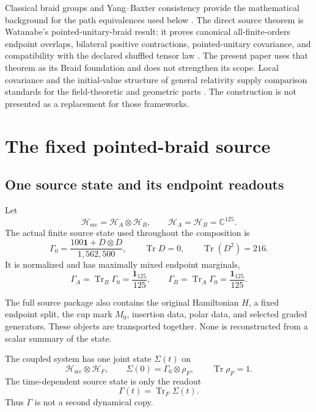 \documentclass[11pt]{article}
\theoremstyle{definition}
\theoremstyle{remark}
\newcommand{\cH}{\mathcal{H}}
\newcommand{\Tr}{\operatorname{Tr}}
\newcommand{\id}{\mathbf{1}}
\begin{document}
Classical braid groups and Yang--Baxter consistency provide the mathematical background for the path equivalences used below \cite{artin1947,yang1967,lamberadford1997}. The direct source theorem is Watanabe's pointed-unitary-braid result: it proves canonical all-finite-orders endpoint overlaps, bilateral positive contractions, pointed-unitary covariance, and compatibility with the declared shuffled tensor law \cite{watanabe2026braid}. The present paper uses that theorem as its Braid foundation and does not strengthen its scope. Local covariance and the initial-value structure of general relativity supply comparison standards for the field-theoretic and geometric parts \cite{brunetti2003,choquet2008}. The construction is not presented as a replacement for those frameworks.

\section{The fixed pointed-braid source}

\subsection{One source state and its endpoint readouts}

Let
\begin{equation}
  \cH_{\mathrm{src}}=\cH_A\otimes\cH_B,
  \qquad \cH_A=\cH_B=\mathbb{C}^{125}.
\end{equation}
The actual finite source state used throughout the composition is
\begin{equation}\label{eq:gamma0}
  \Gamma_0=\frac{100\id+D\otimes D}{1{,}562{,}500},
  \qquad \Tr D=0,\qquad \Tr(D^2)=216.
\end{equation}
It is normalized and has maximally mixed endpoint marginals,
\begin{equation}
  \Gamma_A=\Tr_B\Gamma_0=\frac{\id_{125}}{125},
  \qquad
  \Gamma_B=\Tr_A\Gamma_0=\frac{\id_{125}}{125}.
\end{equation}

The full source package also contains the original Hamiltonian $H$, a fixed endpoint split, the cup mark $M_0$, insertion data, polar data, and selected graded generators. These objects are transported together. None is reconstructed from a scalar summary of the state.

The coupled system has one joint state $\Sigma(t)$ on
\begin{equation}
  \cH_{\mathrm{src}}\otimes\cH_F,
  \qquad \Sigma(0)=\Gamma_0\otimes\rho_F,
  \qquad \Tr\rho_F=1.
\end{equation}
The time-dependent source state is only the readout
\begin{equation}\label{eq:reduced}
  \Gamma(t)=\Tr_F\Sigma(t).
\end{equation}
Thus $\Gamma$ is not a second dynamical copy.
\end{document}
